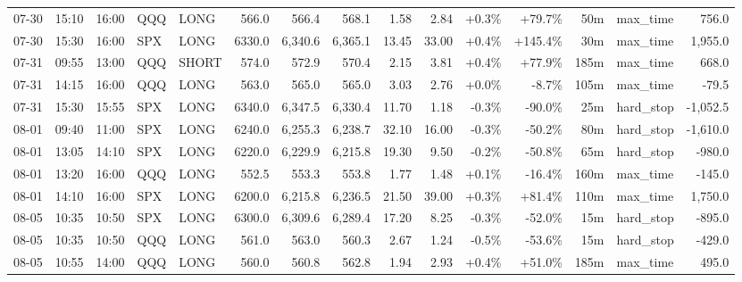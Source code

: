 \documentclass[11pt,a4paper,twoside]{article}
\begin{document}
\begin{landscape}
\begin{center}
\begin{longtable}{>{\color{txtmain}}l l l l l r r r r r r r r >{\color{txtmain}}l r}
07-30 & 15:10 & 16:00 & QQQ & LONG & 566.0 & 566.4 & 568.1 & 1.58 & 2.84 & \textcolor{wingreen}{+0.3\%} & \textcolor{wingreen}{+79.7\%} & 50m & max\_time & \textcolor{wingreen}{756.0} \\
07-30 & 15:30 & 16:00 & SPX & LONG & 6330.0 & 6,340.6 & 6,365.1 & 13.45 & 33.00 & \textcolor{wingreen}{+0.4\%} & \textcolor{wingreen}{+145.4\%} & 30m & max\_time & \textcolor{wingreen}{1,955.0} \\
07-31 & 09:55 & 13:00 & QQQ & SHORT & 574.0 & 572.9 & 570.4 & 2.15 & 3.81 & \textcolor{wingreen}{+0.4\%} & \textcolor{wingreen}{+77.9\%} & 185m & max\_time & \textcolor{wingreen}{668.0} \\
07-31 & 14:15 & 16:00 & QQQ & LONG & 563.0 & 565.0 & 565.0 & 3.03 & 2.76 & \textcolor{wingreen}{+0.0\%} & \textcolor{lossred}{-8.7\%} & 105m & max\_time & \textcolor{lossred}{-79.5} \\
07-31 & 15:30 & 15:55 & SPX & LONG & 6340.0 & 6,347.5 & 6,330.4 & 11.70 & 1.18 & \textcolor{lossred}{-0.3\%} & \textcolor{lossred}{-90.0\%} & 25m & hard\_stop & \textcolor{lossred}{-1,052.5} \\
08-01 & 09:40 & 11:00 & SPX & LONG & 6240.0 & 6,255.3 & 6,238.7 & 32.10 & 16.00 & \textcolor{lossred}{-0.3\%} & \textcolor{lossred}{-50.2\%} & 80m & hard\_stop & \textcolor{lossred}{-1,610.0} \\
08-01 & 13:05 & 14:10 & SPX & LONG & 6220.0 & 6,229.9 & 6,215.8 & 19.30 & 9.50 & \textcolor{lossred}{-0.2\%} & \textcolor{lossred}{-50.8\%} & 65m & hard\_stop & \textcolor{lossred}{-980.0} \\
08-01 & 13:20 & 16:00 & QQQ & LONG & 552.5 & 553.3 & 553.8 & 1.77 & 1.48 & \textcolor{wingreen}{+0.1\%} & \textcolor{lossred}{-16.4\%} & 160m & max\_time & \textcolor{lossred}{-145.0} \\
08-01 & 14:10 & 16:00 & SPX & LONG & 6200.0 & 6,215.8 & 6,236.5 & 21.50 & 39.00 & \textcolor{wingreen}{+0.3\%} & \textcolor{wingreen}{+81.4\%} & 110m & max\_time & \textcolor{wingreen}{1,750.0} \\
08-05 & 10:35 & 10:50 & SPX & LONG & 6300.0 & 6,309.6 & 6,289.4 & 17.20 & 8.25 & \textcolor{lossred}{-0.3\%} & \textcolor{lossred}{-52.0\%} & 15m & hard\_stop & \textcolor{lossred}{-895.0} \\
08-05 & 10:35 & 10:50 & QQQ & LONG & 561.0 & 563.0 & 560.3 & 2.67 & 1.24 & \textcolor{lossred}{-0.5\%} & \textcolor{lossred}{-53.6\%} & 15m & hard\_stop & \textcolor{lossred}{-429.0} \\
08-05 & 10:55 & 14:00 & QQQ & LONG & 560.0 & 560.8 & 562.8 & 1.94 & 2.93 & \textcolor{wingreen}{+0.4\%} & \textcolor{wingreen}{+51.0\%} & 185m & max\_time & \textcolor{wingreen}{495.0} \\

\end{longtable}
\end{center}
\end{landscape}
\end{document}
